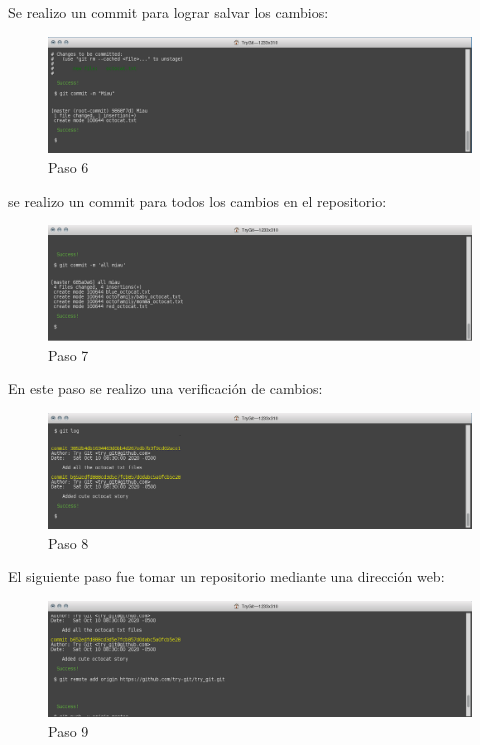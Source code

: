 \documentclass[11pt]{article}
\begin{document}
Se realizo un commit para lograr salvar los cambios:


\begin{figure}[H]
\centering
\includegraphics[scale=0.8]{img/6.png}
\caption{Paso 6}
\label{fig:6}
\end{figure}

se realizo un commit para todos los cambios en el repositorio:

\begin{figure}[H]
\centering
\includegraphics[scale=0.8]{img/7.png}
\caption{Paso 7}
\label{fig:7}
\end{figure}

En este paso se realizo una verificación de cambios:

\begin{figure}[H]
\centering
\includegraphics[scale=0.8]{img/8.png}
\caption{Paso 8}
\label{fig:8}
\end{figure}

El siguiente paso fue tomar un repositorio mediante una dirección web:

\begin{figure}[H]
\centering
\includegraphics[scale=0.8]{img/9.png}
\caption{Paso 9}
\label{fig:9}
\end{figure}
\end{document}
